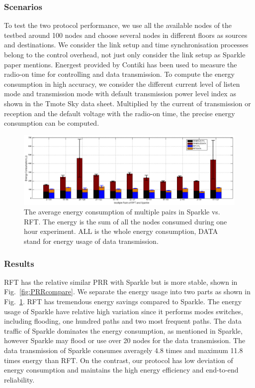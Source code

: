 \documentclass[conference]{IEEEtran}
\begin{document}
\subsubsection{Scenarios}
To test the two protocol performance, we use all the available nodes of the testbed around 100 nodes and choose several nodes in different floors as sources and destinations. We consider the link setup and time synchronisation processes belong to the control overhead, not just only consider the link setup as Sparkle paper mentions. Energest provided by Contiki has been used to measure the radio-on time for controlling and data transmission. To compute the energy consumption in high accuracy, we consider the different current level of listen mode and transmission mode with default transmission power level index as shown in the Tmote Sky data sheet. Multiplied by the current of transmission or reception and the default voltage with the radio-on time, the precise energy consumption can be computed. %
\begin{figure}
\centering
\includegraphics[width=16cm]{stackbar_energy_rft_spkl.png}
\caption{The average energy consumption of multiple pairs in Sparkle vs. RFT. The energy is the sum of all the nodes consumed during one hour experiment. ALL is the whole energy consumption, DATA stand for energy usage of data transmission.}
\label{fig:Energycompare}
\end{figure}
\subsubsection{Results}
RFT has the relative similar PRR with Sparkle but is more stable, shown in Fig.~\ref{fig:PRRcompare}. We separate the energy usage into two parts as shown in Fig.~\ref{fig:Energycompare}. RFT has tremendous energy savings compared to Sparkle. The energy usage of Sparkle have relative high variation since it performs modes switches, including flooding, one hundred paths and two most frequent paths. The data traffic of Sparkle dominates the energy consumption, as mentioned in Sparkle, however Sparkle may flood or use over 20 nodes for the data transmission. The data transmission of Sparkle consumes averagely 4.8 times and maximum 11.8 times energy than RFT. On the contrast, our protocol has low deviation of energy consumption and maintains the high energy efficiency and end-to-end reliability. 
\end{document}
